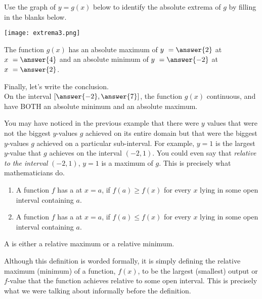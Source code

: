 \documentclass{ximera}
\begin{document}
\begin{exercise}
Use the graph of $y = g(x)$ below to identify the absolute extrema of $g$ by filling in the blanks below. 

\begin{center} \texttt{[image: extrema3.png]} \end{center}

The function $g(x)$ has an absolute maximum of $y \ = \answer{2}$ at $x \ = \answer{4}$ and an absolute minimum of $y \ = \answer{-2}$ at $x \ = \answer{2}$.

\begin{exercise}
Finally, let's write the conclusion.  \\

On the  interval $\left[ \answer{-2}, \answer{7}\right]$, the function $g(x)$  continuous, and  have BOTH an absolute minimum and an absolute maximum. 
\end{exercise}
\end{exercise}

You may have noticed in the previous example that there were $y$ values that were not the biggest $y$-values $g$ achieved on its entire domain but that were the biggest $y$-values $g$ achieved on a particular sub-interval.  For example, $y=1$ is the largest $y$-value that $g$ achieves on the interval $(-2, 1)$.  You could even say that \textit{relative to the interval} $(-2,1)$, $y=1$ is a maximum of $g$.  This is precisely what mathematicians do. 

\begin{definition}\hfil{}
\begin{enumerate}
\item A function $f$ has a  at $x=a$, if $f(a) \ge
  f(x)$ for every $x$ lying in some open interval containing $a$.
\item A function $f$ has a  at $x=a$, if $f(a) \le
  f(x)$ for every $x$ lying in some open interval containing $a$.
\end{enumerate}
A  is either a relative
maximum or a relative minimum.
\end{definition}

\begin{explanation}
Although this definition is worded formally, it is simply defining the relative maximum (minimum) of a function, $f(x)$, to be the largest (smallest) output or $f$-value that the function achieves relative to some open interval.  This is precisely what we were talking about informally before the definition. 
\end{explanation}
\end{document}
